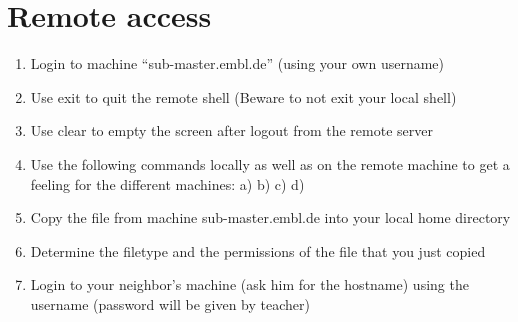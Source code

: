 \documentclass[letterpaper,10pt,english]{sphinxmanual}
\begin{document}
\section{Remote access}
\label{exercises_beginner:remote-access}\begin{enumerate}
\item {} 
Login to machine ``sub-master.embl.de'' (using your own username)

\item {} 
Use exit to quit the remote shell (Beware to not exit your local shell)

\item {} 
Use clear to empty the screen after logout from the remote server

\item {} 
Use the following commands locally as well as on the remote machine to get a feeling for the different machines:
a) 
b) 
c) 
d) 

\item {} 
Copy the file  from machine sub-master.embl.de into your local home directory

\item {} 
Determine the filetype and the permissions of the file that you just copied

\item {} 
Login to your neighbor's machine (ask him for the hostname) using the username  (password will be given by teacher)

\end{enumerate}
\end{document}
